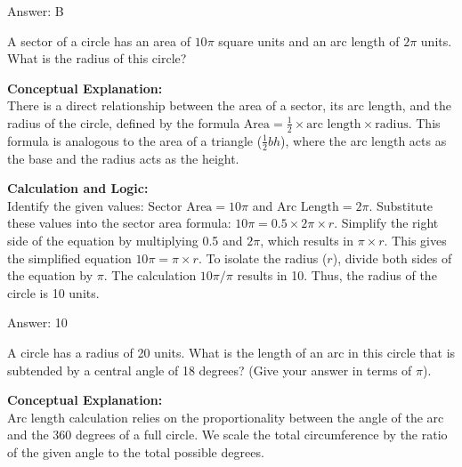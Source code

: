 \documentclass[11pt,paper=a4,answers]{exam}
\begin{document}
\begin{questions}
\begin{solution}
\vspace{30pt}

Answer: \colorbox{yellow!100}{B}
\end{solution}

\vspace{60pt}

\question
A sector of a circle has an area of $10\pi$ square units and an arc length of $2\pi$ units. What is the radius of this circle?

\begin{solution}
\textbf{Conceptual Explanation:} \\
There is a direct relationship between the area of a sector, its arc length, and the radius of the circle, defined by the formula $\text{Area} = \frac{1}{2} \times \text{arc length} \times \text{radius}$. This formula is analogous to the area of a triangle ($\frac{1}{2}bh$), where the arc length acts as the base and the radius acts as the height.

\vspace{30pt}

\textbf{Calculation and Logic:} \\
Identify the given values: $\text{Sector Area} = 10\pi$ and $\text{Arc Length} = 2\pi$. Substitute these values into the sector area formula: $10\pi = 0.5 \times 2\pi \times r$. Simplify the right side of the equation by multiplying 0.5 and $2\pi$, which results in $\pi \times r$. This gives the simplified equation $10\pi = \pi \times r$. To isolate the radius ($r$), divide both sides of the equation by $\pi$. The calculation $10\pi / \pi$ results in 10. Thus, the radius of the circle is 10 units.

\vspace{30pt}

Answer: \colorbox{yellow!100}{10}
\end{solution}

\vspace{60pt}

\question
A circle has a radius of 20 units. What is the length of an arc in this circle that is subtended by a central angle of 18 degrees? (Give your answer in terms of $\pi$).

\begin{solution}
\textbf{Conceptual Explanation:} \\
Arc length calculation relies on the proportionality between the angle of the arc and the 360 degrees of a full circle. We scale the total circumference by the ratio of the given angle to the total possible degrees.


\end{solution}
\end{questions}
\end{document}
